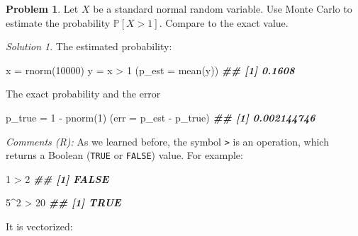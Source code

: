 \documentclass[
]{book}
\newenvironment{Shaded}{\begin{snugshade}}{\end{snugshade}}
\newcommand{\AttributeTok}[1]{\textcolor[rgb]{0.77,0.63,0.00}{#1}}
\newcommand{\DecValTok}[1]{\textcolor[rgb]{0.00,0.00,0.81}{#1}}
\newcommand{\DocumentationTok}[1]{\textcolor[rgb]{0.56,0.35,0.01}{\textbf{\textit{#1}}}}
\newcommand{\FunctionTok}[1]{\textcolor[rgb]{0.00,0.00,0.00}{#1}}
\newcommand{\NormalTok}[1]{#1}
\newcommand{\OtherTok}[1]{\textcolor[rgb]{0.56,0.35,0.01}{#1}}
\newcommand{\SpecialCharTok}[1]{\textcolor[rgb]{0.00,0.00,0.00}{#1}}
\theoremstyle{definition}
\theoremstyle{definition}
\theoremstyle{definition}
\newtheorem{exercise}{Problem}[chapter]
\theoremstyle{definition}
\theoremstyle{remark}
\newtheorem*{solution}{Solution}
\begin{document}
\begin{exercise}
Let \(X\) be a standard normal random variable. Use Monte Carlo to estimate the
probability \({\mathbb{P}}[ X > 1 ]\). Compare to the exact value.
\end{exercise}

\begin{solution}
The estimated probability:

\begin{Shaded}
\begin{Highlighting}[]
\NormalTok{x }\OtherTok{=} \FunctionTok{rnorm}\NormalTok{(}\DecValTok{10000}\NormalTok{)}
\NormalTok{y }\OtherTok{=}\NormalTok{ x }\SpecialCharTok{\textgreater{}} \DecValTok{1}
\NormalTok{(}\AttributeTok{p\_est =} \FunctionTok{mean}\NormalTok{(y))}
\DocumentationTok{\#\# [1] 0.1608}
\end{Highlighting}
\end{Shaded}

The exact probability and the error

\begin{Shaded}
\begin{Highlighting}[]
\NormalTok{p\_true }\OtherTok{=} \DecValTok{1} \SpecialCharTok{{-}} \FunctionTok{pnorm}\NormalTok{(}\DecValTok{1}\NormalTok{)}
\NormalTok{(}\AttributeTok{err =}\NormalTok{ p\_est }\SpecialCharTok{{-}}\NormalTok{ p\_true)}
\DocumentationTok{\#\# [1] 0.002144746}
\end{Highlighting}
\end{Shaded}

\emph{Comments (R):} As we learned before, the symbol \texttt{\textgreater{}} is an operation, which returns a Boolean (\texttt{TRUE} or \texttt{FALSE}) value. For example:

\begin{Shaded}
\begin{Highlighting}[]
\DecValTok{1} \SpecialCharTok{\textgreater{}} \DecValTok{2}
\DocumentationTok{\#\# [1] FALSE}
\end{Highlighting}
\end{Shaded}

\begin{Shaded}
\begin{Highlighting}[]
\DecValTok{5}\SpecialCharTok{\^{}}\DecValTok{2} \SpecialCharTok{\textgreater{}} \DecValTok{20}
\DocumentationTok{\#\# [1] TRUE}
\end{Highlighting}
\end{Shaded}

It is vectorized:


\end{solution}
\end{document}
